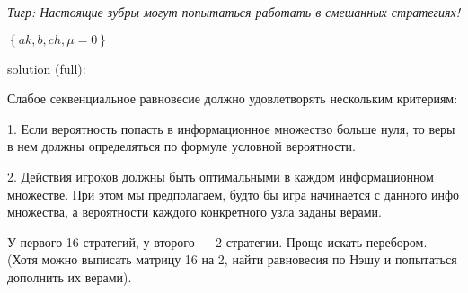 \begin{problem}[Лес ]
{\it Тигр: Настоящие зубры могут попытаться работать в смешанных стратегиях!}\par




\begin{sol}

  $\left\{ak,b,ch,\mu =0\right\}$\par

solution (full): \par
Слабое секвенциальное равновесие должно удовлетворять нескольким критериям: \par
1. Если вероятность попасть в информационное множество больше нуля, то веры в нем должны определяться по формуле условной вероятности. \par
2. Действия игроков должны быть оптимальными в каждом информационном множестве. При этом мы предполагаем, будто бы игра начинается с данного инфо множества, а вероятности каждого конкретного узла заданы верами.\par

У первого 16 стратегий, у второго --- 2 стратегии. Проще искать перебором. (Хотя можно выписать матрицу 16 на 2, найти равновесия по Нэшу и попытаться дополнить их верами).\par


\end{sol}
\end{problem}
